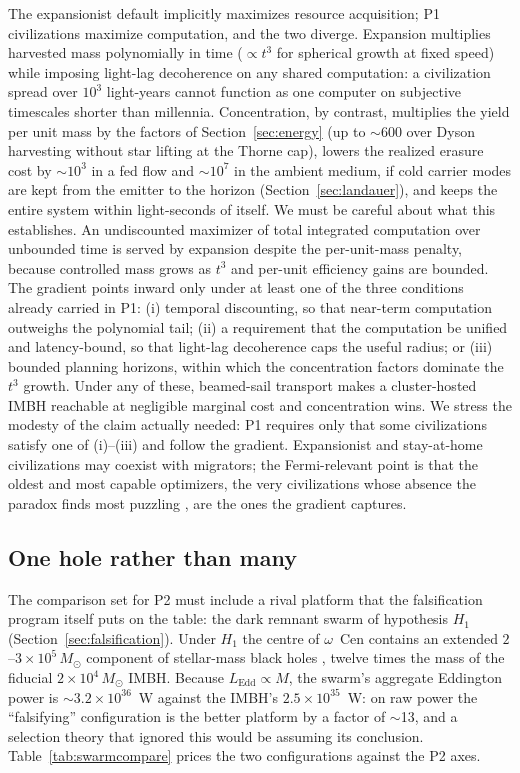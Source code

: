 \documentclass[11pt]{article}
\newcommand{\msun}{\ensuremath{M_\odot}}
\begin{document}
The expansionist default implicitly maximizes resource acquisition; P1 civilizations maximize computation, and the two diverge. Expansion multiplies harvested mass polynomially in time ($\propto t^{3}$ for spherical growth at fixed speed) while imposing light-lag decoherence on any shared computation: a civilization spread over $10^{3}$ light-years cannot function as one computer on subjective timescales shorter than millennia. Concentration, by contrast, multiplies the yield per unit mass by the factors of Section~\ref{sec:energy} (up to $\sim$600 over Dyson harvesting without star lifting at the Thorne cap), lowers the realized erasure cost by $\sim 10^{3}$ in a fed flow and $\sim 10^{7}$ in the ambient medium, if cold carrier modes are kept from the emitter to the horizon (Section~\ref{sec:landauer}), and keeps the entire system within light-seconds of itself. We must be careful about what this establishes. An undiscounted maximizer of total integrated computation over unbounded time is served by expansion despite the per-unit-mass penalty, because controlled mass grows as $t^{3}$ and per-unit efficiency gains are bounded. The gradient points inward only under at least one of the three conditions already carried in P1: (i) temporal discounting, so that near-term computation outweighs the polynomial tail; (ii) a requirement that the computation be unified and latency-bound, so that light-lag decoherence caps the useful radius; or (iii) bounded planning horizons, within which the concentration factors dominate the $t^{3}$ growth. Under any of these, beamed-sail transport makes a cluster-hosted IMBH reachable at negligible marginal cost \citep{Lubin2016,Armstrong2013} and concentration wins. We stress the modesty of the claim actually needed: P1 requires only that some civilizations satisfy one of (i)--(iii) and follow the gradient. Expansionist and stay-at-home civilizations may coexist with migrators; the Fermi-relevant point is that the oldest and most capable optimizers, the very civilizations whose absence the paradox finds most puzzling \citep{Hanson2021}, are the ones the gradient captures.

\subsection{One hole rather than many}
\label{sec:whyone}

The comparison set for P2 must include a rival platform that the falsification program itself puts on the table: the dark remnant swarm of hypothesis $H_1$ (Section~\ref{sec:falsification}). Under $H_1$ the centre of $\omega$~Cen contains an extended $2$--$3\times10^{5}\,\msun$ component of stellar-mass black holes \citep{BanaresHernandez2025}, twelve times the mass of the fiducial $2\times10^{4}\,\msun$ IMBH. Because $L_{\mathrm{Edd}} \propto M$, the swarm's aggregate Eddington power is $\sim$$3.2\times10^{36}$~W against the IMBH's $2.5\times10^{35}$~W: on raw power the ``falsifying'' configuration is the better platform by a factor of $\sim$13, and a selection theory that ignored this would be assuming its conclusion. Table~\ref{tab:swarmcompare} prices the two configurations against the P2 axes.
\end{document}
